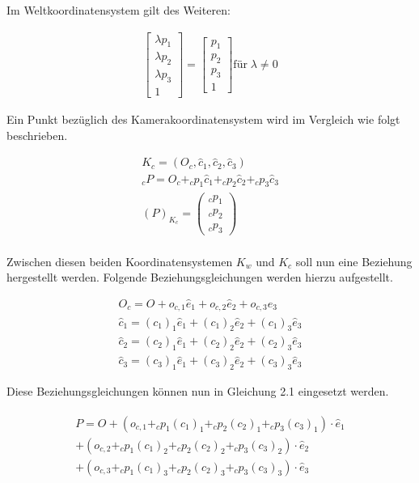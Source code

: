 	Im Weltkoordinatensystem gilt des Weiteren:
	
	\begin{gather}
	\begin{bmatrix}\lambda p_1\\ \lambda p_2 \\ \lambda p_3 \\ 1 \end{bmatrix} = \begin{bmatrix}p_1 \\ p_2 \\ p_3 \\ 1\end{bmatrix} \text{für} \; \lambda \ne 0
	\end{gather}
	\pagebreak
	
	Ein Punkt bezüglich des Kamerakoordinatensystem wird im Vergleich wie folgt beschrieben.
	
	\begin{gather}
	K_c = (O_c, \hat{c}_1, \hat{c}_2, \hat{c}_3)\\
	_cP = O_c + _cp_1\hat{c}_1 + _cp_2\hat{c}_2 + _cp_3\hat{c}_3\\
	(P)_{K_c} = \begin{pmatrix}_cp_1 \\ _cp_2 \\ _cp_3\end{pmatrix}
	\end{gather}\\
	
	Zwischen diesen beiden Koordinatensystemen	 \ensuremath{K_w}  und \ensuremath{K_c} soll nun eine Beziehung hergestellt werden. Folgende Beziehungsgleichungen werden hierzu aufgestellt. 
	
	\begin{gather}
	O_c = O + o_{c,1}\hat{e}_1 + o_{c,2}\hat{e}_2 + o_{c,3}\hat{e}_3\\
	\hat{c}_1 = (c_1)_1\hat{e}_1 +  (c_1)_2\hat{e}_2 +  (c_1)_3\hat{e}_3\\
	\hat{c}_2 = (c_2)_1\hat{e}_1 +  (c_2)_2\hat{e}_2 +  (c_2)_3\hat{e}_3\\
	\hat{c}_3 = (c_3)_1\hat{e}_1 +  (c_3)_2\hat{e}_2 +  (c_3)_3\hat{e}_3
	\end{gather}
	
	Diese Beziehungsgleichungen können nun in Gleichung 2.1 eingesetzt werden.
	
	\begin{gather}
	\begin{split}
	P = O + (o_{c,1} + _cp_1(c_1)_1 + _cp_2(c_2)_1 + _cp_3(c_3)_1) \cdot \hat{e}_1 \\
	+ (o_{c,2} + _cp_1(c_1)_2 + _cp_2(c_2)_2 + _cp_3(c_3)_2) \cdot \hat{e}_2\\
	+ (o_{c,3} + _cp_1(c_1)_3 + _cp_2(c_2)_3 + _cp_3(c_3)_3) \cdot \hat{e}_3
	\end{split}
	\end{gather}
	
